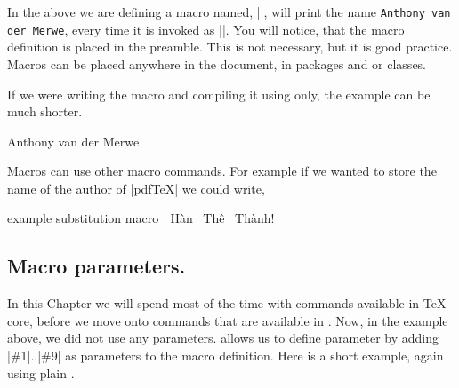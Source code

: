 




In the above we are defining a macro named, |\myshortcut|, will print the name \texttt{Anthony van der Merwe}, every time it is invoked as |\myshortcut|. You will notice, that the macro definition is placed in the preamble. This is not necessary, but it is good practice. Macros can be placed anywhere in the document, in packages and or classes.

If we were writing the macro and compiling it using \tex only, the example can be much shorter.

\begin{teX}
\def\myshortcut{Anthony van der Merwe}
\myshortcut
\bye
\end{teX}

Macros can use other macro commands. For example if we wanted to store the name of the author of |pdfTeX| we could write,

\begin{texexample}{example substitution macro}{}
\def\Thanh{^^A
      H\`an~%
      \texorpdfstring{Th\^e\llap{\raise 0.5ex\hbox{\'{}}}}%
      {}%
      ~Th\`anh^^a
    }
\Thanh 
\end{texexample}




\subsection{Macro parameters.} 

In this Chapter we will spend most of the time with commands available in TeX core, before we move onto commands that are available in \latex. Now, in the example above, we did not use any parameters. \tex allows us to define parameter by adding |\#1|..|\#9| as parameters to the macro definition. Here is a short example, again using plain \tex. 


